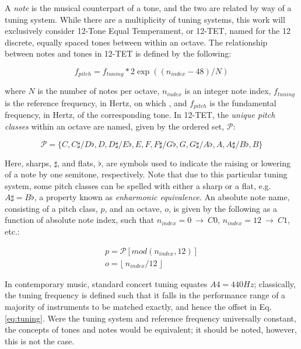 A \emph{note} is the musical counterpart of a tone, and the two are related by way of a tuning system.
While there are a multiplicity of tuning systems, this work will exclusively consider 12-Tone Equal Temperament, or 12-TET, named for the 12 discrete, equally spaced tones between within an octave.
The relationship between notes and tones in 12-TET is defined by the following:

\begin{equation}
\label{eq:tuning}
f_{pitch} = f_{tuning} * 2 \exp((n_{index} - 48) / N)
\end{equation}

\noindent where $N$ is the number of notes per octave, $n_{index}$ is an integer note index, $f_{tuning}$ is the reference frequency, in Hertz, on which , and $f_{pitch}$ is the fundamental frequency, in Hertz, of the corresponding tone.
In 12-TET, the \emph{unique pitch classes} within an octave are named, given by the ordered set, $\mathcal{P}$:

\begin{equation}
\label{eq:pitch_classes}
\mathcal{P} = \{C, C\sharp / D\flat, D, D\sharp / E\flat, E, F, F\sharp / G\flat, G, G\sharp / A\flat, A, A\sharp / B\flat, B\}
\end{equation}

Here, sharps, $\sharp$, and flats, $\flat$, are symbols used to indicate the raising or lowering of a note by one semitone, respectively.
Note that due to this particular tuning system, some pitch classes can be spelled with either a sharp or a flat, e.g. $A\sharp = B\flat$, a property known as \emph{enharmonic equivalence}.
An absolute note name, consisting of a pitch class, $p$, and an octave, $o$, is given by the following as a function of absolute note index, such that $n_{index}=0~\to~C0$, $n_{index}=12~\to~C1$, etc.:

\begin{align*}
p = \mathcal{P}[mod(n_{index}, 12)] \\
o = \lfloor~n_{index} / 12~\rfloor
\end{align*}

In contemporary music, standard concert tuning equates $A4=440Hz$; classically, the tuning frequency is defined such that it falls in the performance range of a majority of instruments to be matched exactly, and hence the offset in Eq. \ref{eq:tuning}.
Were the tuning system and reference frequency universally constant, the concepts of tones and notes would be equivalent; it should be noted, however, this is not the case.

